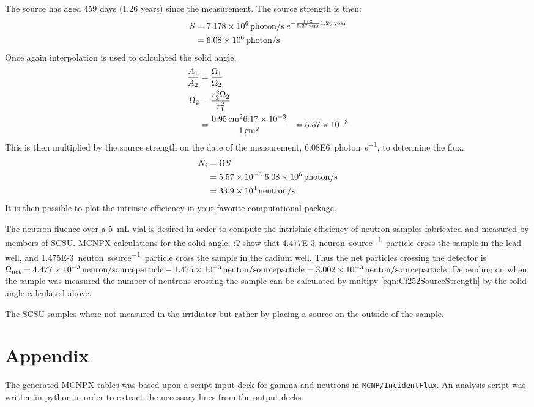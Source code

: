 \documentclass[draftcls,onecolumn]{IEEEtran}
\begin{document}
\begin{Exercise*}[label={PEN LiF with ADS},title={PEN LiF film with ADS},name={Example}]
The  source has aged 459 days (1.26 years) since the measurement.
The source strength is then:
\begin{align}
  S &= \SI{7.178E6}{photon\per\second}\;e^{-\frac{ \ln{2}}{\SI{5.27}{year}}\SI{1.26}{year}} \\ \notag
    &= \SI{6.08E6}{photon\per\second}
\end{align}
Once again interpolation is used to calculated the solid angle.
\begin{align*}
	\frac{A_1}{A_2} &= \frac{\Omega_1}{\Omega_2} \\ \notag
	\Omega_2 &= \frac{r_2^2 \Omega_2}{r_1^2} \\
	 &= \frac{\SI{0.95}{\cm}^2 \num{6.17E-3}}{\SI{1}{\cm}^2}
	 &= \num{5.57E-3}
\end{align*}
This is then multiplied by the source strength on the date of the measurement, \SI{6.08E6}{photon\per\second}, to determine the flux.
\begin{align*}
 	N_i &= \Omega S \\
	 &= \num{5.57E-3} \; \SI{6.08E6}{photon\per\second} \\
      &= \SI{33.9E4}{neutron\per\second}
\end{align*}
It is then possible to plot the intrinsic efficiency in your favorite computational package.

\end{Exercise*}
\begin{Exercise*}[label={LiquidSample},title={Liquid Sample},name={Example}]
The neutron fluence over a \SI{5}{\milli\liter} vial is desired in order to compute the intrisinic efficiency of neutron samples fabricated and measured by members of SCSU.
MCNPX calculations for the solid angle, $\Omega$ show that \SI{4.477E-3}{neuron\per source particle} cross the sample in the lead well, and \SI{1.475E-3}{neuton\per source particle} cross the sample in the cadium well.
Thus the net particles crossing the detector is $\Omega_{\text{net}} =\SI{4.477E-3}{neuron\per source particle} - \SI{1.475E-3}{neuton\per source particle} =\SI{3.002E-3}{neuton\per source particle} $.
Depending on when the sample was measured the number of neutrons crossing the sample can be calculated by multipy \eqref{eqn:Cf252SourceStrength} by the solid angle calculated above.

The SCSU samples where not measured in the  irridiator but rather by placing a source on the outside of the sample.

\end{Exercise*}



\section{Appendix}
The generated MCNPX tables was based upon a script input deck for gamma and neutrons in \verb+MCNP/IncidentFlux+.
An analysis script was written in python in order to extract the necessary lines from the output decks.
\end{document}
